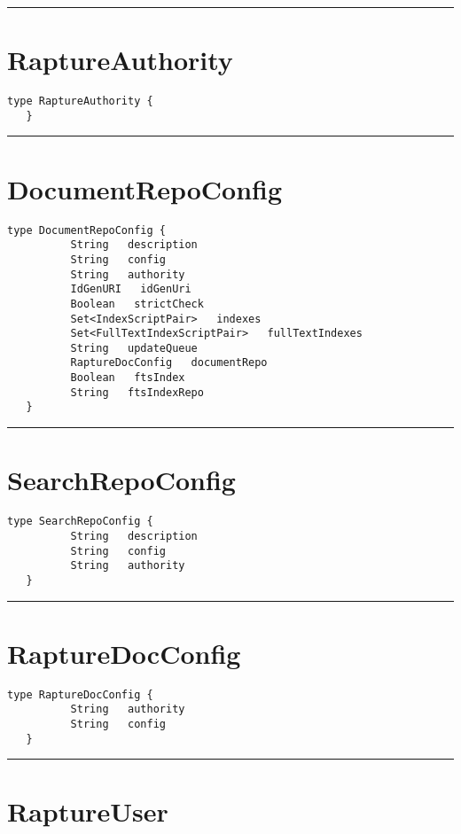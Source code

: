 \rule{12cm}{2pt}
\section{RaptureAuthority}
\label{type:RaptureAuthority}

\begin{lstlisting}[style=nonumbers]
   type RaptureAuthority {
   }
\end{lstlisting}

\rule{12cm}{2pt}
\section{DocumentRepoConfig}
\label{type:DocumentRepoConfig}

\begin{lstlisting}[style=nonumbers]
   type DocumentRepoConfig {
          String   description
          String   config
          String   authority
          IdGenURI   idGenUri
          Boolean   strictCheck
          Set<IndexScriptPair>   indexes
          Set<FullTextIndexScriptPair>   fullTextIndexes
          String   updateQueue
          RaptureDocConfig   documentRepo
          Boolean   ftsIndex
          String   ftsIndexRepo
   }
\end{lstlisting}

\rule{12cm}{2pt}
\section{SearchRepoConfig}
\label{type:SearchRepoConfig}

\begin{lstlisting}[style=nonumbers]
   type SearchRepoConfig {
          String   description
          String   config
          String   authority
   }
\end{lstlisting}

\rule{12cm}{2pt}
\section{RaptureDocConfig}
\label{type:RaptureDocConfig}

\begin{lstlisting}[style=nonumbers]
   type RaptureDocConfig {
          String   authority
          String   config
   }
\end{lstlisting}

\rule{12cm}{2pt}
\section{RaptureUser}
\label{type:RaptureUser}

